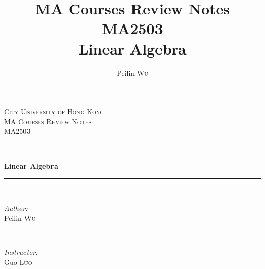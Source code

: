 \documentclass[UTF8,a4paper,11pt]{amsbook}
\title{MA Courses Review Notes\\MA2503 \\Linear Algebra}
\author{Peilin \textsc{Wu}
}
\begin{document}

\frontmatter


\begin{titlepage}
\newcommand{\HRule}{\rule{\linewidth}{0.5mm}} %

\center %


\textsc{\LARGE City University of Hong Kong}\\[1.5cm] %
\textsc{\Large MA Courses Review Notes}\\[0.5cm] 		%
\textsc{\large {MA2503}}\\[0.5cm] 						%


\HRule \\[0.4cm]
{ \huge \bfseries  \textsf{Linear Algebra}\\[0.4cm] %
}
\HRule \\[1.5cm]


\begin{minipage}{0.4\textwidth}
\begin{flushleft} \large
\emph{Author:}\\
Peilin \textsc{Wu} 
\end{flushleft}
\end{minipage}
~
\begin{minipage}{0.4\textwidth}
\begin{flushright} \large
\emph{Instructor:} \\
Guo \textsc{Luo} %
\end{flushright}
\end{minipage}\\[2cm]


\end{titlepage}
\end{document}
